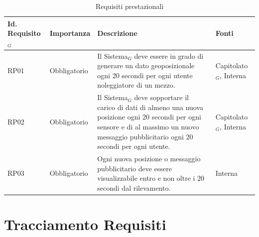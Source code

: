 \documentclass[10pt]{article}
\begin{document}
\begin{justify}
\begin{table}[H]
\centering
\renewcommand{\arraystretch}{1.5}
\begin{tabular}{|>{\centering\arraybackslash}m{2.7cm}|>{\centering\arraybackslash}m{2.7cm}|>{\centering\arraybackslash}m{6cm}|>{\centering\arraybackslash}m{2.1cm}|}
\hline
\textbf{Id. Requisito$_G$} & \textbf{Importanza} & \textbf{Descrizione} & \textbf{Fonti}\\
\hline
RP01 & Obbligatorio &  Il Sistema$_G$ deve essere in grado di generare un dato geoposizionale ogni 20 secondi per ogni utente noleggiatore di un mezzo. & Capitolato$_G$, Interna\\
\hline
RP02 & Obbligatorio &  Il Sistema$_G$ deve sopportare il carico di dati di almeno una nuova posizione ogni 20 secondi per ogni sensore e di al massimo un nuovo messaggio pubblicitario ogni 20 secondi per ogni utente. & Capitolato$_G$, Interna\\
\hline
RP03 & Obbligatorio &  Ogni nuova posizione o messaggio pubblicitario deve essere visualizzabile entro e non oltre i 20 secondi dal rilevamento. & Interna\\
\hline
\end{tabular}
\caption{Requisiti prestazionali}
\end{table}

\newpage
\section{Tracciamento Requisiti}


\end{justify}
\end{document}
